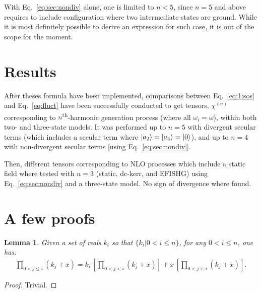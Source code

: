 \documentclass[12pt,a4paper]{article}
\begin{document}
With Eq.~\eqref{eq:sec:nondiv}  alone, one is limited to $n<5$, since $n=5$ and above requires to include configuration where two intermediate states are ground. While it is most definitely possible to derive an expression for such case, it is out of the scope for the moment.

\section{Results}

After theses formula have been implemented, comparisons between Eq.~\eqref{eq:1:sos} and Eq.~\eqref{eq:fluct} have been successfully conducted to get tensors, $\chi^{(n)}$ corresponding to $n$\textsuperscript{th}-harmonic generation process (where all $\omega_i = \omega$), within both two- and three-state models.
It was performed up to  $n = 5$ with divergent secular terms (which includes a secular term where $\ket{a_2} = \ket{a_4} = \ket{0}$), and up to $n=4$ with non-divergent secular terms [using Eq.~\eqref{eq:sec:nondiv}].

Then, different tensors corresponding to NLO processes which include a static field where tested with $n=3$ (static, dc-kerr, and EFISHG) using Eq.~\eqref{eq:sec:nondiv} and a three-state model. No sign of divergence where found.


\clearpage
\appendix
\section{A few proofs}
\setcounter{equation}{0} 
\renewcommand{\theequation}{A\arabic{equation}}

\newtheorem{theorem}{Theorem}[section]
\newtheorem{lemma}[theorem]{Lemma}

\begin{lemma}\label{lem:1}
	Given a set of reals $k_i$ so that $\{k_i|0<i\leq n\}$,  for any $0<i\leq n$, one has:\begin{align}
		\prod_{0<j\leq i} (k_j+x)= k_{i}\,\left[\prod_{0<j<i} (k_j+x) \right] + x\,\left[\prod_{0<j<i} (k_j+x) \right].\label{eq:p1:ind}
	\end{align}
\end{lemma}
\begin{proof}
	Trivial.
\end{proof}
\end{document}
